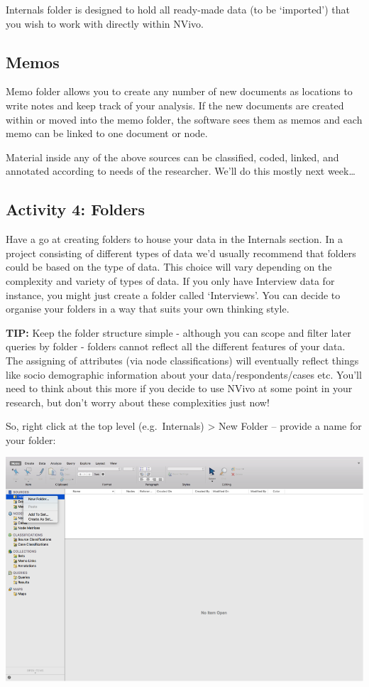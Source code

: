 \documentclass[]{book}
\theoremstyle{definition}
\theoremstyle{definition}
\theoremstyle{definition}
\theoremstyle{remark}
\begin{document}
Internals folder is designed to hold all ready-made data (to be
`imported') that you wish to work with directly within NVivo.

\hypertarget{memos}{%
\subsection{Memos}\label{memos}}

Memo folder allows you to create any number of new documents as
locations to write notes and keep track of your analysis. If the new
documents are created within or moved into the memo folder, the software
sees them as memos and each memo can be linked to one document or node.

Material inside any of the above sources can be classified, coded,
linked, and annotated according to needs of the researcher. We'll do
this mostly next week\ldots{}

\hypertarget{activity-4-folders}{%
\subsection{Activity 4: Folders}\label{activity-4-folders}}

Have a go at creating folders to house your data in the Internals
section. In a project consisting of different types of data we'd usually
recommend that folders could be based on the type of data. This choice
will vary depending on the complexity and variety of types of data. If
you only have Interview data for instance, you might just create a
folder called `Interviews'. You can decide to organise your folders in a
way that suits your own thinking style.

\textbf{TIP:} Keep the folder structure simple - although you can scope
and filter later queries by folder - folders cannot reflect all the
different features of your data. The assigning of attributes (via node
classifications) will eventually reflect things like socio demographic
information about your data/respondents/cases etc. You'll need to think
about this more if you decide to use NVivo at some point in your
research, but don't worry about these complexities just now!

So, right click at the top level (e.g.~Internals) \textgreater{} New
Folder -- provide a name for your folder:

\includegraphics{imgs/qual_10.png}
\end{document}
